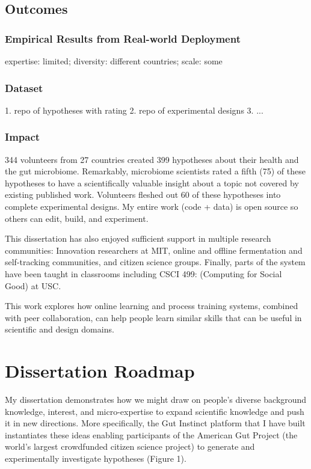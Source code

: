 \subsection{Outcomes}
\subsubsection{Empirical Results from Real-world Deployment}
expertise: limited; diversity: different countries; scale: some

\subsubsection{Dataset}
1. repo of hypotheses with rating
2. repo of experimental designs
3. ...

\subsubsection{Impact}
344 volunteers from 27 countries created 399 hypotheses about their health and the gut microbiome. Remarkably, microbiome scientists rated a fifth (75) of these hypotheses to have a scientifically valuable insight about a topic not covered by existing published work. Volunteers fleshed out 60 of these hypotheses into complete experimental designs. My entire work (code + data) is open source so others can edit, build, and experiment.

This dissertation has also enjoyed sufficient support in multiple research communities: Innovation researchers at MIT, online and offline fermentation and self-tracking communities, and citizen science groups. Finally, parts of the system have been taught in classrooms including CSCI 499: (Computing for Social Good) at USC. 

This work explores how online learning and process training systems, combined with
peer collaboration, can help people learn similar skills that
can be useful in scientific and design domains.


\section{Dissertation Roadmap}


My dissertation demonstrates how we might draw on people’s diverse background knowledge, interest, and micro-expertise to expand scientific knowledge and push it in new directions. More specifically, the Gut Instinct platform that I have built instantiates these ideas enabling participants of the American Gut Project (the world’s largest crowdfunded citizen science project) to generate and experimentally investigate hypotheses (Figure 1). 

